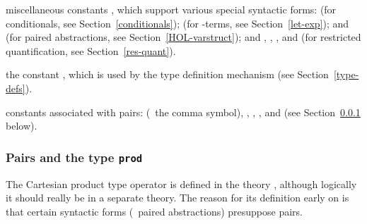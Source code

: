 {{\begin{myenumerate}
\item miscellaneous constants%
%
%
%
%
%
%
%
%
%
, which support various special syntactic forms:
 (for conditionals, see Section~\ref{conditionals});
 (for -terms, see Section~\ref{let-exp});
 and  (for paired abstractions, 
see Section~\ref{HOL-varstruct}); and
,
,
,
and  (for restricted quantification, 
see Section~\ref{res-quant}).

\item the constant , which is used by the type definition mechanism (see Section~\ref{type-defs}).

\item constants associated with pairs:
 \ml{,} (\ie\ the comma symbol), 
, , ,  and 
(see Section~\ref{prod} below).
\end{myenumerate}

\subsubsection{Pairs and the type {\tt prod}}
\label{prod}

The Cartesian  product  type  operator   is  defined  in  the  theory , although logically it should really  be in  a separate  theory.  The
reason for its  definition early  on is that certain  syntactic forms (\eg\
paired abstractions) presuppose pairs.  

}}
